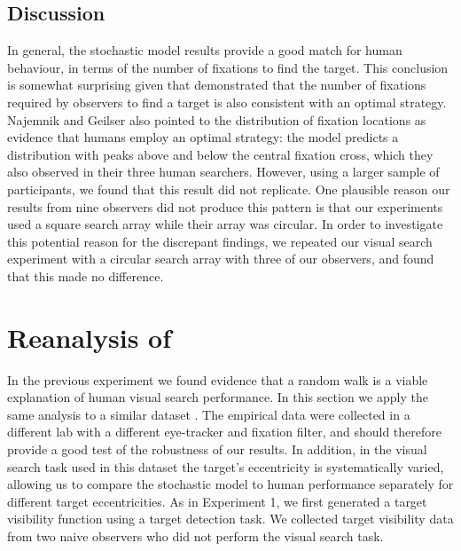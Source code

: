 \documentclass[man]{apa6}
\begin{document}
\subsection{Discussion}

In general, the stochastic model results provide a good match for human behaviour, in terms of the number of fixations to find the target. This conclusion is somewhat surprising given that \textcite{najemnik-geisler2008} demonstrated that the number of fixations required by observers to find a target is also consistent with an optimal strategy. Najemnik and Geilser also pointed to the distribution of fixation locations as evidence that humans employ an optimal strategy: the model predicts a distribution with peaks above and below the central fixation cross, which they also observed in their three human searchers.  However, using a larger sample of participants, we found that this result did not replicate. One plausible reason our results from nine observers did not produce this pattern is that our experiments used a square search array while their array was circular. In order to investigate this potential reason for the discrepant findings, we repeated our visual search experiment with a circular search array with three of our observers, and found that this made no difference. 

\section{Reanalysis of \textcite{clarke2009}}
\label{sec:surfacesearch}

In the previous experiment we found evidence that a random walk is a viable explanation of human visual search performance. In this section we apply the same analysis to a similar dataset \parencite{clarke2009}. The empirical data were collected in a different lab with a different eye-tracker and fixation filter, and should therefore provide a good test of the robustness of our results. In addition, in the visual search task used in this dataset the target's eccentricity is systematically varied, allowing us to compare the stochastic model to human performance separately for different target eccentricities. As in Experiment 1, we first generated a target visibility function using a target detection task. We collected target visibility data from two naive observers who did not perform the visual search task.
\end{document}
